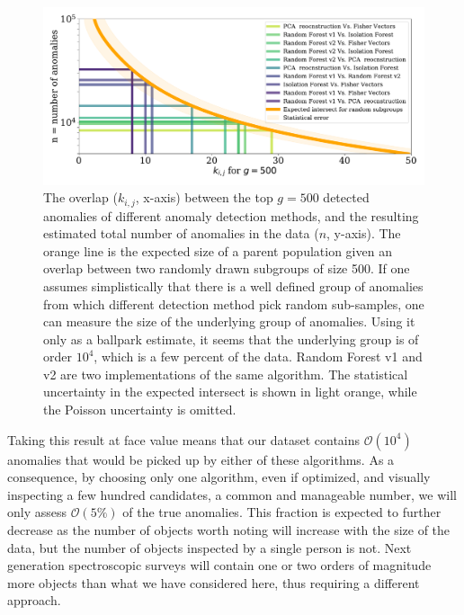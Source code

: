 \documentclass[fleqn,usenatbib]{mnras}
\begin{document}
{\begin{figure}
  \begin{center}
  \includegraphics[width=\columnwidth]{intersect.pdf}
  \caption{The overlap ($k_{i,j}$, x-axis) between the top $g=500$ detected anomalies of different anomaly detection methods, and the resulting estimated total number of anomalies in the data ($n$, y-axis). The orange line is the expected size of a parent population given an overlap between two randomly drawn subgroups of size 500. If one assumes simplistically that there is a well defined group of anomalies from which different detection method pick  random sub-samples, one can measure the size of the underlying group of anomalies. Using it only as a ballpark estimate, it seems that the underlying group is of order $10^4$, which is a few percent of the data. Random Forest v1 and v2 are two implementations of the same algorithm.  The statistical uncertainty in the expected intersect is shown in light orange, while the Poisson uncertainty is omitted. }\label{fig:underlying_size}
  \end{center}
\end{figure}

Taking this result at face value means that our dataset contains $\mathcal{O}(10^4)$ anomalies that would be picked up by either of these algorithms. As a consequence, by choosing only one algorithm, even if optimized, and visually inspecting a few hundred candidates, a common and manageable number, we will only assess  $\mathcal{O}(5\%)$ of the true anomalies.  This fraction is expected to further decrease as the number of objects worth noting will increase with the size of the data, but the number of objects inspected by a single person is not. Next generation spectroscopic surveys will contain one or two orders of magnitude more objects than what we have considered here, thus requiring a different approach. 

}
\end{document}
